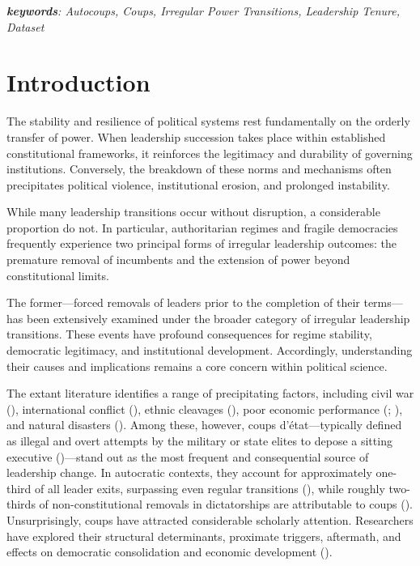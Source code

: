 \documentclass[
  12pt,
]{report}
\begin{document}
\emph{\textbf{keywords}: Autocoups, Coups, Irregular Power Transitions,
Leadership Tenure, Dataset}

\section{Introduction}\label{introduction-1}

The stability and resilience of political systems rest fundamentally on
the orderly transfer of power. When leadership succession takes place
within established constitutional frameworks, it reinforces the
legitimacy and durability of governing institutions. Conversely, the
breakdown of these norms and mechanisms often precipitates political
violence, institutional erosion, and prolonged instability.

While many leadership transitions occur without disruption, a
considerable proportion do not. In particular, authoritarian regimes and
fragile democracies frequently experience two principal forms of
irregular leadership outcomes: the premature removal of incumbents and
the extension of power beyond constitutional limits.

The former---forced removals of leaders prior to the completion of their
terms---has been extensively examined under the broader category of
irregular leadership transitions. These events have profound
consequences for regime stability, democratic legitimacy, and
institutional development. Accordingly, understanding their causes and
implications remains a core concern within political science.

The extant literature identifies a range of precipitating factors,
including civil war (), international conflict (), ethnic cleavages
(), poor
economic performance (;
), and natural
disasters (). Among these, however, coups d'état---typically defined as
illegal and overt attempts by the military or state elites to depose a
sitting executive ()---stand out as the most frequent and consequential source of
leadership change. In autocratic contexts, they account for
approximately one-third of all leader exits, surpassing even regular
transitions (), while
roughly two-thirds of non-constitutional removals in dictatorships are
attributable to coups ().
Unsurprisingly, coups have attracted considerable scholarly attention.
Researchers have explored their structural determinants, proximate
triggers, aftermath, and effects on democratic consolidation and
economic development ().
\end{document}
